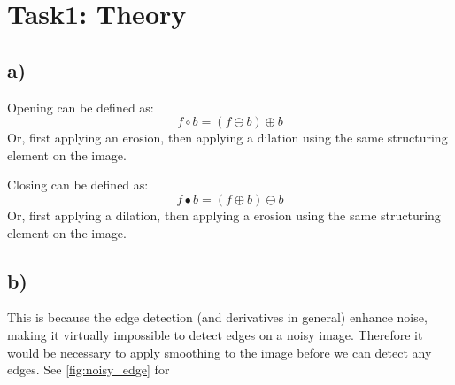 \section{Task1: Theory}
\subsection*{a)}
Opening can be defined as: 
\begin{equation}
    f \circ b = (f \ominus b) \oplus b
\end{equation}
Or, first applying an erosion, then applying a dilation using the same structuring element on the image. 

Closing can be defined as: 
\begin{equation}
    f \bullet b = (f \oplus b) \ominus b
\end{equation}
Or, first applying a dilation, then applying a erosion using the same structuring element on the image. 


\subsection*{b)}
This is because the edge detection (and derivatives in general) enhance noise, making it virtually impossible to detect edges on a noisy image. Therefore it would be necessary to apply smoothing to the image before we can detect any edges. See \cref{fig:noisy_edge} for 

